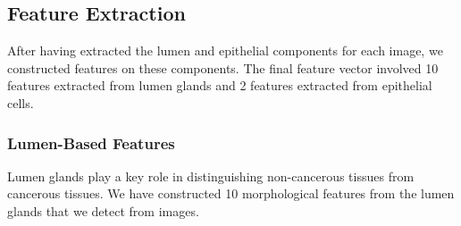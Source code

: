 \subsection{Feature Extraction}
After having extracted the lumen and epithelial components for each image, we constructed features on these components. The final feature vector involved 10 features extracted from lumen glands and 2 features extracted from epithelial cells.

\subsubsection{Lumen-Based Features}
Lumen glands play a key role in distinguishing non-cancerous tissues from cancerous tissues. We have constructed 10 morphological features from the lumen glands that we detect from images.

